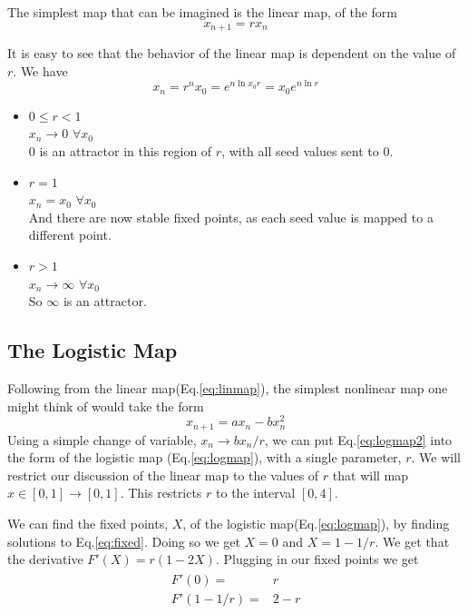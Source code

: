 \documentclass[paper=a4, fontsize=11pt, abstract=on]{scrartcl} %
\numberwithin{equation}{section}
\numberwithin{figure}{section}
\numberwithin{table}{section}
\begin{document}
The simplest map that can be imagined is the linear map, of the form
\begin{equation}
  \label{eq:linmap}
  x_{n+1} = rx_n
\end{equation}

It is easy to see that the behavior of the linear map is dependent on
the value of $r$. We have 
\begin{equation}
  \label{eq:linmap1}
  x_{n} = r^nx_0 = e^{n\ln x_0r} = x_0 e^{n\ln r}
\end{equation}
\begin{itemize}
\item $0\leq r < 1$\\
  $x_n\rightarrow 0$ $\forall x_0$\\
  0 is an attractor in this region of $r$, with all seed values sent to
  0.
\item $r=1$\\
  $x_n = x_0$ $\forall x_0$\\
  And there are now stable fixed points, as each seed value is mapped
  to a different point.
\item $r>1$\\
  $x_n\rightarrow \infty$ $\forall x_0$\\
  So $\infty$ is an attractor.
\end{itemize}

\subsection{The Logistic Map}
\label{sec:logmap}

Following from the linear map(Eq.\ref{eq:linmap}), the simplest
nonlinear map one might think of would take the form
\begin{equation}
  \label{eq:logmap2}
  x_{n+1} = ax_n - bx_n^2
\end{equation}
Using a simple change of variable, $x_n\rightarrow bx_n/r$, we can put
Eq.\ref{eq:logmap2} into the form of the logistic map
(Eq.\ref{eq:logmap}), with a single parameter, $r$.
We will restrict our discussion of the linear map to the values of $r$
that will map $x\in [0,1] \rightarrow [0,1]$. This restricts $r$ to
the interval $[0,4]$.

\vline

We can find the fixed points, $X$, of the logistic
map(Eq.\ref{eq:logmap}), by finding solutions to
Eq.\ref{eq:fixed}. Doing so we get $X=0$ and $X=1-1/r$. We get that
the derivative $F'(X) = r(1-2X)$. Plugging in our fixed points we get
\begin{align}
\begin{split}
  \label{eq:fixedderivs}
  F'(0) = & r \\
  F'(1-1/r) = & 2-r
\end{split}
\end{align}
\end{document}
